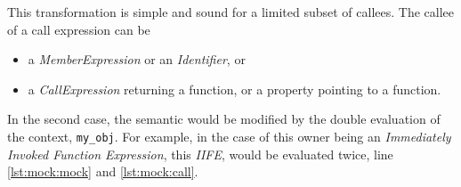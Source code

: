 This transformation is simple and sound for a limited subset of callees.
The callee of a call expression can be
\begin{itemize}
  \item a \textit{MemberExpression} or an \textit{Identifier}, or
  \item a \textit{CallExpression} returning a function, or a property pointing to a function.
\end{itemize}
In the second case, the semantic would be modified by the double evaluation of the context, \texttt{my_obj}.
For example, in the case of this owner being an \textit{Immediately Invoked Function Expression}, this \textit{IIFE}, would be evaluated twice, line \ref{lst:mock:mock} and \ref{lst:mock:call}.











